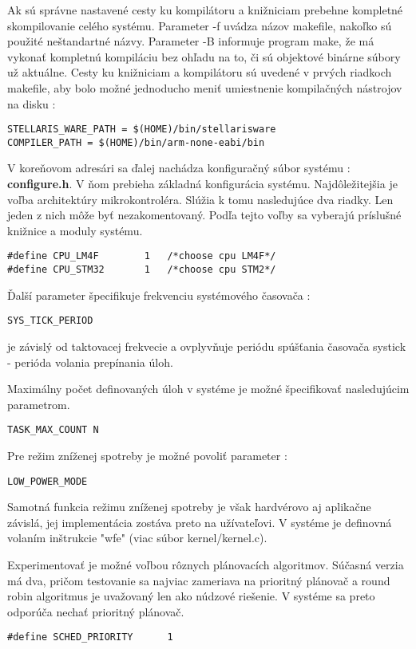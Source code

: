 Ak sú správne nastavené cesty ku kompilátoru a knižniciam prebehne kompletné skompilovanie celého systému. Parameter -f uvádza názov makefile, nakoľko sú použité neštandartné názvy. Parameter -B informuje program make, že má vykonať kompletnú kompiláciu bez ohľadu na to, či sú objektové binárne súbory už aktuálne.
Cesty ku knižniciam a kompilátoru sú uvedené v prvých riadkoch makefile, aby bolo možné jednoducho meniť umiestnenie kompilačných nástrojov na disku :

{\small
\begin{verbatim}
STELLARIS_WARE_PATH = $(HOME)/bin/stellarisware
COMPILER_PATH = $(HOME)/bin/arm-none-eabi/bin
\end{verbatim}
}

V koreňovom adresári sa ďalej nachádza konfiguračný súbor systému : \textbf{configure.h}. V ňom prebieha základná konfigurácia systému. Najdôležitejšia je voľba architektúry mikrokontroléra. Slúžia k tomu nasledujúce dva riadky. Len jeden z nich môže byť nezakomentovaný. Podľa tejto voľby sa vyberajú príslušné knižnice a moduly systému.

{\small
\begin{verbatim}
#define CPU_LM4F		1	/*choose cpu LM4F*/
#define CPU_STM32		1	/*choose cpu STM2*/
\end{verbatim}
}

Ďalší parameter špecifikuje frekvenciu systémového časovača : 
\begin{verbatim}SYS_TICK_PERIOD\end{verbatim} 
je závislý od taktovacej frekvecie a ovplyvňuje periódu spúšťania časovača systick - perióda volania prepínania úloh.

Maximálny počet definovaných úloh v systéme je možné špecifikovať nasledujúcim parametrom.
\begin{verbatim}TASK_MAX_COUNT N\end{verbatim}

Pre režim zníženej spotreby je možné povoliť parameter : 
\begin{verbatim}LOW_POWER_MODE\end{verbatim}
Samotná funkcia režimu zníženej spotreby je však hardvérovo aj aplikačne závislá, jej implementácia zostáva preto na užívateľovi. V systéme je definovná volaním inštrukcie "wfe" (viac súbor kernel/kernel.c).

Experimentovať je možné voľbou rôznych plánovacích algoritmov. Súčasná verzia má dva, pričom testovanie sa najviac zameriava na prioritný plánovač a round robin algoritmus je uvažovaný len ako núdzové riešenie. V systéme sa preto odporúča nechať prioritný plánovač.
{\small
\begin{verbatim}
#define SCHED_PRIORITY		1
\end{verbatim}
}


